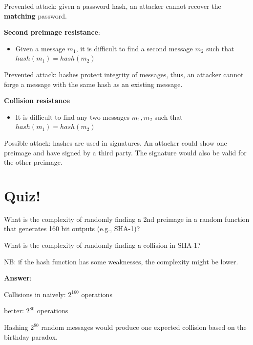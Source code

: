 \documentclass[11pt]{article}
\begin{document}
Prevented attack: given a password hash, an attacker cannot recover the \textbf{matching} password.

\textbf{Second preimage resistance}:

\begin{itemize}
	\item Given a message $m_1$, it is difficult to find a second message $m_2$ such that $hash(m_1) = hash(m_2)$
\end{itemize}

Prevented attack: hashes protect integrity of messages, thus, an attacker cannot forge a message with the same hash as an existing message.

\textbf{Collision resistance}

\begin{itemize}
	\item It is difficult to find any two messages $m_1, m_2$ such that $hash(m_1) = hash(m_2)$
\end{itemize}

Possible attack: hashes are used in signatures. An attacker could show one preimage and have signed by a third party. The signature would also be valid for the other preimage.


\section*{Quiz!}

What is the complexity of randomly finding a 2nd preimage in a random function that generates 160 bit outputs (e.g., SHA-1)?

What is the complexity of randomly finding a collision in SHA-1? 

NB: if the hash function has some weaknesses, the complexity might be lower. 

\textbf{Answer}: 

\begin{tcolorbox}[
  colback=green!15,     %
  colframe=black!50,    %
  boxrule=1pt,       %
  arc=3mm,             %
  left=4mm, right=4mm, top=2mm, bottom=2mm %
]
Collisions in naively: $2^{160}$ operations

better: $2^{80}$ operations

Hashing $2^{80}$ random messages would produce one expected collision based on the birthday paradox.

\end{tcolorbox}
\end{document}
